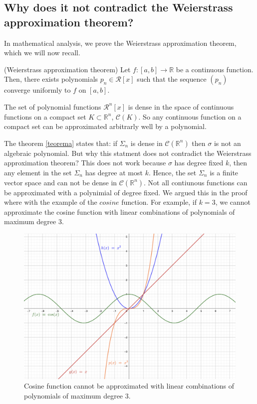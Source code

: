 \documentclass[../main.tex]{subfiles}
\begin{document}
\subsection{Why does it not contradict the Weierstrass approximation theorem? }

\noindent In mathematical analysis, we prove the Weierstrass approximation theorem, which we will now recall. 
\begin{theorem}(Weierstrass  approximation theorem)
	Let $f:[a,b]\rightarrow \mathbb{R} $ be a continuous function. Then, there exists polynomials $p_n\in \mathcal{R}[x]$ such that the sequence $(p_n)$ converge uniformly to $f$ on $[a,b]$. 
\end{theorem} 

\begin{corolari}
	The set of polynomial functions $\mathcal{R}^n[x]$ is dense in the space of continuous functions on a compact set $K \subset \mathbb{R}^n$, $\mathcal{C}(K)$. So any continuous function on a compact set can be approximated arbitrarly well by a polynomial. 
\end{corolari}

\noindent The theorem \ref{teorema} states that: if $\Sigma_n$ is dense in $\mathcal{C}(\mathbb{R}^n)$ then $\sigma$ is not an algebraic polynomial. But why this statment does not contradict the Weierstrass approximation theorem?
This does not work because $\sigma$ has degree fixed $k$, then any element in the set $\Sigma_n$ has degree at most $k$. Hence, the set $\Sigma_n$ is a finite vector space and can not be dense in $\mathcal{C}(\mathbb{R}^n)$. Not all contiunous functions can be approximated with a polynimial of degree fixed. We argued this in the proof where with the example of the $cosine$ function. For example, if $k=3$, we cannot approximate the cosine function with linear combinations of polynomials of maximum degree 3.

\begin{figure}[h]
	\centering
	\includegraphics[width=0.6\linewidth]{imgs/cos.png}
	\caption{\small Cosine function cannot be approximated with linear combinations of polynomials of maximum degree 3.} 
\end{figure} \mbox{} \par
\end{document}
